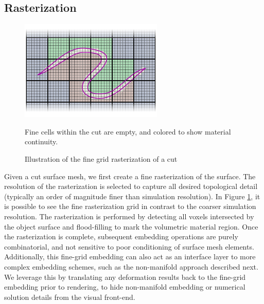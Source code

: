 \subsection{Rasterization}

\begin{figure}
  \centering
  \vspace*{-.25in}
  \includegraphics[width=\columnwidth]{chapter_gridiron/images/Figure_Topology_C}
\vspace*{-.3in}
  \caption{Illustration of the fine grid rasterization of a cut}{Fine cells within the cut are empty, and colored to show material continuity.}
\label{Fig:CuttingFineGrid}
\end{figure}

Given a cut surface mesh, we first create a fine rasterization of the
surface. The resolution of the rasterization is selected to capture
all desired topological detail (typically an order of magnitude finer
than simulation resolution). In Figure \ref{Fig:CuttingFineGrid}, it
is possible to see the fine rasterization grid in contrast to the
coarser simulation resolution.  The rasterization is performed by
detecting all voxels intersected by the object surface and
flood-filling to mark the volumetric material region.  Once the
rasterization is complete, subsequent embedding operations are purely
combinatorial, and not sensitive to poor conditioning of surface mesh
elements.  Additionally, this fine-grid embedding can also act as an
interface layer to more complex embedding schemes, such as the
non-manifold approach described next. We leverage this by translating
any deformation results back to the fine-grid embedding prior to
rendering, to hide non-manifold embedding or numerical solution
details from the visual front-end.

